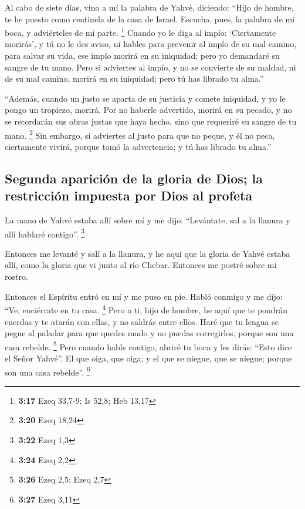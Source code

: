 \begin{paracol}{2}
 Al cabo de siete días, vino a mí la palabra de Yahvé,
diciendo:  ``Hijo de hombre, te he puesto como centinela
de la casa de Israel. Escucha, pues, la palabra de mi boca, y
adviérteles de mi parte. \footnote{\textbf{3:17} Ezeq 33,7-9; Is 52,8;
  Heb 13,17}  Cuando yo le diga al impío: `Ciertamente
morirás', y tú no le des aviso, ni hables para prevenir al impío de su
mal camino, para salvar su vida, ese impío morirá en su iniquidad; pero
yo demandaré su sangre de tu mano.  Pero si adviertes al
impío, y no se convierte de su maldad, ni de su mal camino, morirá en su
iniquidad; pero tú has librado tu alma.''

 ``Además, cuando un justo se aparta de su justicia y
comete iniquidad, y yo le pongo un tropiezo, morirá. Por no haberle
advertido, morirá en su pecado, y no se recordarán sus obras justas que
haya hecho, sino que requeriré su sangre de tu mano. \footnote{\textbf{3:20}
  Ezeq 18,24}  Sin embargo, si adviertes al justo para
que no peque, y él no peca, ciertamente vivirá, porque tomó la
advertencia; y tú has librado tu alma.''

\hypertarget{segunda-apariciuxf3n-de-la-gloria-de-dios-la-restricciuxf3n-impuesta-por-dios-al-profeta}{%
\subsection{Segunda aparición de la gloria de Dios; la restricción
impuesta por Dios al
profeta}\label{segunda-apariciuxf3n-de-la-gloria-de-dios-la-restricciuxf3n-impuesta-por-dios-al-profeta}}

 La mano de Yahvé estaba allí sobre mí y me dijo:
``Levántate, sal a la llanura y allí hablaré contigo''. \footnote{\textbf{3:22}
  Ezeq 1,3}

 Entonces me levanté y salí a la llanura, y he aquí que
la gloria de Yahvé estaba allí, como la gloria que vi junto al río
Chebar. Entonces me postré sobre mi rostro.

 Entonces el Espíritu entró en mí y me puso en pie. Habló
conmigo y me dijo: ``Ve, enciérrate en tu casa. \footnote{\textbf{3:24}
  Ezeq 2,2}  Pero a ti, hijo de hombre, he aquí que te
pondrán cuerdas y te atarán con ellas, y no saldrás entre ellos.
 Haré que tu lengua se pegue al paladar para que quedes
mudo y no puedas corregirlos, porque son una casa rebelde. \footnote{\textbf{3:26}
  Ezeq 2,5; Ezeq 2,7}  Pero cuando hable contigo, abriré
tu boca y les dirás: ``Esto dice el Señor Yahvé''. El que oiga, que
oiga; y el que se niegue, que se niegue; porque son una casa rebelde''.
\footnote{\textbf{3:27} Ezeq 3,11}


\end{paracol}

